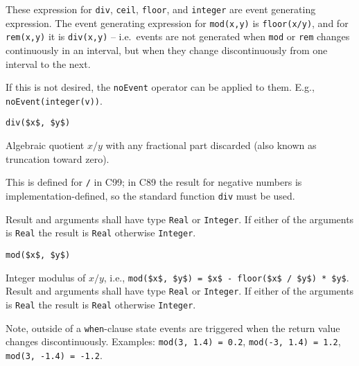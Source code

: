 These expression for \lstinline!div!, \lstinline!ceil!, \lstinline!floor!, and \lstinline!integer! are event generating expression.
The event generating expression for \lstinline!mod(x,y)! is \lstinline!floor(x/y)!, and for \lstinline!rem(x,y)! it is \lstinline!div(x,y)! -- i.e.\ events are not generated when \lstinline!mod! or \lstinline!rem! changes continuously in an interval, but when they change discontinuously from one interval to the next.

\begin{nonnormative}
If this is not desired, the \lstinline!noEvent! operator can be applied to them.
E.g., \lstinline!noEvent(integer(v))!.
\end{nonnormative}

\begin{operatordefinition}[div]
\begin{synopsis}\begin{lstlisting}
div($x$, $y$)
\end{lstlisting}\end{synopsis}
\begin{semantics}
Algebraic quotient $x / y$ with any fractional part discarded (also known as truncation toward zero).
\begin{nonnormative}
This is defined for \lstinline!/! in C99; in C89 the result for negative numbers is implementation-defined, so the standard function \lstinline[language=C]!div! must be used.
\end{nonnormative}
Result and arguments shall have type \lstinline!Real! or \lstinline!Integer!.
If either of the arguments is \lstinline!Real! the result is \lstinline!Real! otherwise \lstinline!Integer!.
\end{semantics}
\end{operatordefinition}

\begin{operatordefinition}[mod]
\begin{synopsis}\begin{lstlisting}
mod($x$, $y$)
\end{lstlisting}\end{synopsis}
\begin{semantics}
Integer modulus of $x / y$, i.e., \lstinline!mod($x$, $y$) = $x$ - floor($x$ / $y$) * $y$!.
Result and arguments shall have type \lstinline!Real! or \lstinline!Integer!.
If either of the arguments is \lstinline!Real! the result is \lstinline!Real! otherwise \lstinline!Integer!.
\begin{nonnormative}
Note, outside of a \lstinline!when!-clause state events are triggered when the return value changes discontinuously.
Examples: \lstinline!mod(3, 1.4) = 0.2!, \lstinline!mod(-3, 1.4) = 1.2!, \lstinline!mod(3, -1.4) = -1.2!.
\end{nonnormative}
\end{semantics}
\end{operatordefinition}

